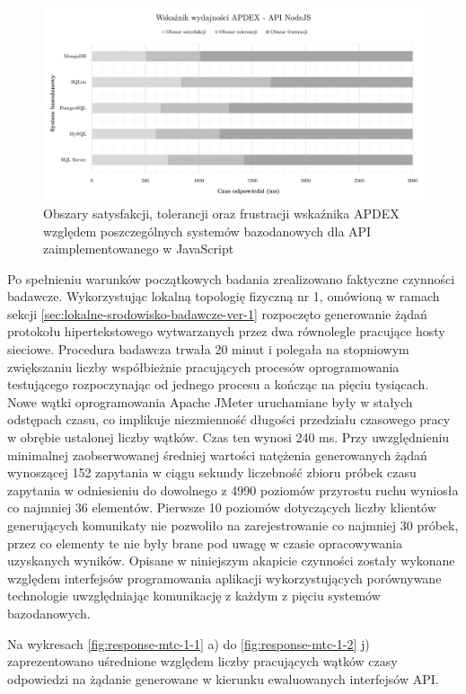 \clearpage

\begin{figure}[htb]
    \centering
     \includegraphics[width=\linewidth]{rys05/apdex-nodejs.pdf}
    \caption{Obszary satysfakcji, tolerancji oraz frustracji wskaźnika APDEX względem poszczególnych systemów bazodanowych dla API zaimplementowanego w JavaScript}
    \label{fig:apdex-nodejs}
\end{figure}

Po spełnieniu warunków początkowych badania zrealizowano faktyczne czynności badawcze. Wykorzystując lokalną topologię fizyczną nr 1, omówioną w ramach sekcji \ref{sec:lokalne-srodowisko-badawcze-ver-1} rozpoczęto generowanie żądań protokołu hipertekstowego wytwarzanych przez dwa równolegle pracujące hosty sieciowe. Procedura badawcza trwała 20 minut i polegała na stopniowym zwiększaniu liczby współbieżnie pracujących procesów oprogramowania testującego rozpoczynając od jednego procesu a kończąc na pięciu tysiącach. Nowe wątki oprogramowania Apache JMeter uruchamiane były w stałych odstępach czasu, co implikuje niezmienność długości przedziału czasowego pracy w obrębie ustalonej liczby wątków. Czas ten wynosi 240 ms. Przy uwzględnieniu minimalnej zaobserwowanej średniej wartości natężenia generowanych żądań wynoszącej 152 zapytania w ciągu sekundy liczebność zbioru próbek czasu zapytania w odniesieniu do dowolnego z 4990 poziomów przyrostu ruchu wyniosła co najmniej 36 elementów. Pierwsze 10 poziomów dotyczących liczby klientów generujących komunikaty nie pozwoliło na zarejestrowanie co najmniej 30 próbek, przez co elementy te nie były brane pod uwagę w czasie opracowywania uzyskanych wyników. Opisane w niniejszym akapicie czynności zostały wykonane względem interfejsów programowania aplikacji wykorzystujących porównywane technologie uwzględniając komunikację z każdym z pięciu systemów bazodanowych.

Na wykresach \ref{fig:response-mtc-1-1} a) do \ref{fig:response-mtc-1-2} j) zaprezentowano uśrednione względem liczby pracujących wątków czasy odpowiedzi na żądanie generowane w kierunku ewaluowanych interfejsów API.

